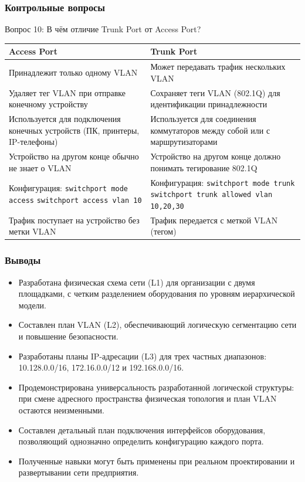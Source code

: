 \begin{frame}
\frametitle{Контрольные вопросы}
\begin{block}{Вопрос 10: В чём отличие Trunk Port от Access Port?}
\begin{table}[h]
\centering
\begin{tabular}{|p{4cm}|p{4cm}|}
\hline
\textbf{Access Port} & \textbf{Trunk Port} \\
\hline
Принадлежит только одному VLAN & Может передавать трафик нескольких VLAN \\
\hline
Удаляет тег VLAN при отправке конечному устройству & Сохраняет теги VLAN (802.1Q) для идентификации принадлежности \\
\hline
Используется для подключения конечных устройств (ПК, принтеры, IP-телефоны) & Используется для соединения коммутаторов между собой или с маршрутизаторами \\
\hline
Устройство на другом конце обычно не знает о VLAN & Устройство на другом конце должно понимать тегирование 802.1Q \\
\hline
Конфигурация: \texttt{switchport mode access} \newline \texttt{switchport access vlan 10} & Конфигурация: \texttt{switchport mode trunk} \newline \texttt{switchport trunk allowed vlan 10,20,30} \\
\hline
Трафик поступает на устройство без метки VLAN & Трафик передается с меткой VLAN (тегом) \\
\hline
\end{tabular}
\end{table}
\end{block}
\end{frame}

\begin{frame}
\frametitle{Выводы}
\begin{itemize}
    \item Разработана физическая схема сети (L1) для организации с двумя площадками, с четким разделением оборудования по уровням иерархической модели.
    \item Составлен план VLAN (L2), обеспечивающий логическую сегментацию сети и повышение безопасности.
    \item Разработаны планы IP-адресации (L3) для трех частных диапазонов: 10.128.0.0/16, 172.16.0.0/12 и 192.168.0.0/16.
    \item Продемонстрирована универсальность разработанной логической структуры: при смене адресного пространства физическая топология и план VLAN остаются неизменными.
    \item Составлен детальный план подключения интерфейсов оборудования, позволяющий однозначно определить конфигурацию каждого порта.
    \item Полученные навыки могут быть применены при реальном проектировании и развертывании сети предприятия.
\end{itemize}
\end{frame}


